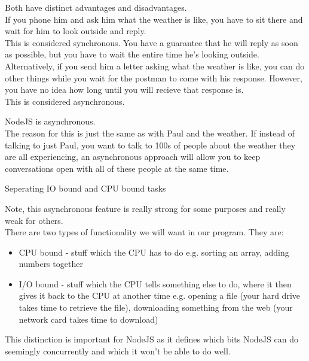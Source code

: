 \documentclass{beamer}
\begin{document}
\begin{frame}

Both have distinct advantages and disadvantages.\\
\pause
If you phone him and ask him what the weather is like, you have to sit there and wait for him to look outside and reply.\\
\pause
This is considered synchronous. You have a guarantee that he will reply as soon as possible, but you have to wait the entire time he's looking outside.\\
\pause
Alternatively, if you send him a letter asking what the weather is like, you can do other things while you wait for the postman to come with his response. However, you have no idea how long until you will recieve that response is.\\
\pause
This is considered asynchronous.

\end{frame}

\begin{frame}

NodeJS is asynchronous.\\ \pause
The reason for this is just the same as with Paul and the weather. \pause If instead of talking to just Paul, you want to talk to 100s of people about the weather they are all experiencing, an asynchronous approach will allow you to keep conversations open with all of these people at the same time.\\

\end{frame}

\begin{frame}{Seperating IO bound and CPU bound tasks}

Note, this asynchronous feature is really strong for some purposes and really weak for others.\\
There are two types of functionality we will want in our program. They are:
\pause
\begin{itemize}
  \item CPU bound \pause - stuff which the CPU has to do e.g. sorting an array, adding numbers together \pause
  \item I/O bound \pause - stuff which the CPU tells something else to do, where it then gives it back to the CPU at another time e.g. opening a file (your hard drive takes time to retrieve the file), downloading something from the web (your network card takes time to download)
\end{itemize}

\pause

This distinction is important for NodeJS as it defines which bits NodeJS can do seemingly concurrently and which it won't be able to do well.

\end{frame}
\end{document}
